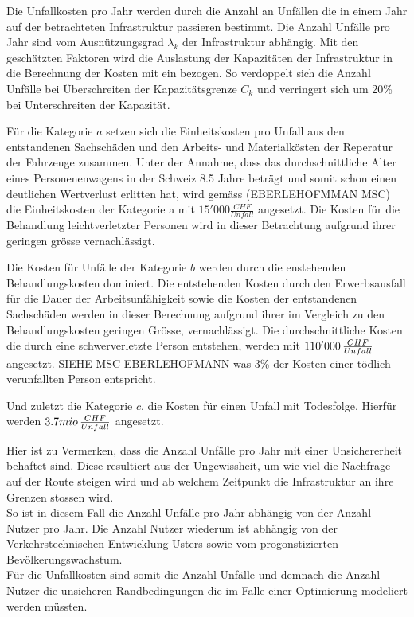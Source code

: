 Die Unfallkosten pro Jahr werden durch die Anzahl an Unfällen die in einem Jahr auf der betrachteten Infrastruktur passieren bestimmt. Die Anzahl Unfälle pro Jahr sind vom  Ausnützungsgrad \( \lambda_{k} \) der Infrastruktur abhängig. Mit den geschätzten Faktoren wird die Auslastung der Kapazitäten der Infrastruktur in die Berechnung der Kosten mit ein bezogen. So verdoppelt sich die Anzahl Unfälle bei Überschreiten der Kapazitätsgrenze $C_{k}$ und verringert sich um 20\% bei Unterschreiten der Kapazität.

\begin{IMleftrightskip}
Für die Kategorie $a$ setzen sich die Einheitskosten pro Unfall aus den entstandenen Sachschäden und den Arbeits- und Materialkösten der Reperatur der Fahrzeuge zusammen. Unter der Annahme, dass das durchschnittliche Alter eines Personenenwagens in der Schweiz 8.5 Jahre beträgt und somit schon einen deutlichen Wertverlust erlitten hat, wird gemäss (EBERLEHOFMMAN MSC) die Einheitskosten der Kategorie a mit $15'000 \frac{CHF}{Unfall}$ angesetzt. Die Kosten für die Behandlung leichtverletzter Personen wird in dieser Betrachtung aufgrund ihrer geringen grösse vernachlässigt.

Die Kosten für Unfälle der Kategorie $b$ werden durch die enstehenden Behandlungskosten dominiert. Die entstehenden Kosten durch den Erwerbsausfall für die Dauer der Arbeitsunfähigkeit sowie die Kosten der entstandenen Sachschäden werden in dieser Berechnung aufgrund ihrer im Vergleich zu den Behandlungskosten geringen Grösse, vernachlässigt.  Die durchschnittliche Kosten die durch eine schwerverletzte Person entstehen, werden mit $110'000 \thinspace \frac{CHF}{Unfall}$ angesetzt. SIEHE MSC EBERLEHOFMANN was 3\% der Kosten einer tödlich verunfallten Person entspricht.

Und zuletzt die Kategorie $c$, die Kosten für einen Unfall mit Todesfolge. Hierfür werden $3.7mio \thinspace \frac{CHF}{Unfall}$ angesetzt.
\end{IMleftrightskip}

Hier ist zu Vermerken, dass die Anzahl Unfälle pro Jahr mit einer Unsichererheit behaftet sind. Diese resultiert aus der Ungewissheit, um wie viel die Nachfrage auf der Route steigen wird und ab welchem Zeitpunkt die Infrastruktur an ihre Grenzen stossen wird.\\ [2ex]
So ist in diesem Fall die Anzahl Unfälle pro Jahr abhängig von der Anzahl Nutzer pro Jahr. Die Anzahl Nutzer wiederum ist abhängig von der Verkehrstechnischen Entwicklung Usters sowie vom progonstizierten Bevölkerungswachstum. \\
Für die Unfallkosten sind somit die Anzahl Unfälle und demnach die Anzahl Nutzer die unsicheren Randbedingungen die im Falle einer Optimierung modeliert werden müssten.



%

